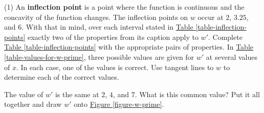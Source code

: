 \documentclass[12pt,]{book}
\newcommand{\terminology}[1]{\textbf{#1}}
\theoremstyle{plain}
\theoremstyle{definition}
\numberwithin{equation}{section}
\newcommand{\hrulemedium}{\noalign{\hrule height 0.07em}}
\newcommand{\hrulethick} {\noalign{\hrule height 0.11em}}
\newcounter{figstack}
\newcounter{figindex}
\newlength\fight
\newcommand\pushValignCaptionBottom[5][b]{%
\stepcounter{figstack}%
\expandafter\def\csname %
figalign\romannumeral\value{figstack}\endcsname{#1}%
\expandafter\def\csname %
figtype\romannumeral\value{figstack}\endcsname{#2}%
\expandafter\def\csname %
figwd\romannumeral\value{figstack}\endcsname{#3}%
\expandafter\def\csname %
figcontent\romannumeral\value{figstack}\endcsname{#4}%
\expandafter\def\csname %
figcap\romannumeral\value{figstack}\endcsname{#5}%
\setbox0=\hbox{%
\begin{#2}{#3}#4\end{#2}}%
\ifdim\dimexpr\ht0+\dp0\relax>\fight\global\setlength{\fight}{%
\dimexpr\ht0+\dp0\relax}\fi%
}
\newcommand\popValignCaptionBottom{%
\setcounter{figindex}{0}%
\hfill%
\whiledo{\value{figindex}<\value{figstack}}{%
\stepcounter{figindex}%
\def\tmp{\csname figwd\romannumeral\value{figindex}\endcsname}%
\begin{\csname figtype\romannumeral\value{figindex}\endcsname}[t]{\tmp}%
\centering%
\stackinset{c}{}%
{\csname figalign\romannumeral\value{figindex}\endcsname}{}%
{\csname figcontent\romannumeral\value{figindex}\endcsname}%
{\rule{0pt}{\fight}}\par%
\csname figcap\romannumeral\value{figindex}\endcsname%
\end{\csname figtype\romannumeral\value{figindex}\endcsname}%
\hfill%
}%
\setcounter{figstack}{0}%
\setlength{\fight}{0pt}%
\hfill%
}
\newcommand{\fe}[2]{#1\mathopen{}\left(#2\right)\mathclose{}}
\newcommand{\fd}[1]{#1'}
\begin{document}
\begin{exercisegroup}(1)
\exercise[17.]\hypertarget{exercise-245}{\null} An \terminology{inflection point} is a point where the function is continuous and the concavity of the function changes. The inflection points on \(w\) occur at \(2\), \(3.25\), and \(6\). With that in mind, over each interval stated in \hyperref[table-inflection-points]{Table \ref{table-inflection-points}} exactly two of the properties from its caption apply to \(\fd{w}\). Complete \hyperref[table-inflection-points]{Table \ref{table-inflection-points}} with the appropriate pairs of properties.%
\exercise[18.]\hypertarget{exercise-246}{\null}In \hyperref[table-values-for-w-prime]{Table \ref{table-values-for-w-prime}}, three possible values are given for \(\fd{w}\) at several values of \(x\). In each case, one of the values is correct. Use tangent lines to \(w\) to determine each of the correct values.%
\exercise[19.]\hypertarget{exercise-247}{\null}The value of \(\fd{w}\) is the same at \(2\), \(4\), and \(7\). What is this common value?%
\exercise[20.]\hypertarget{exercise-248}{\null}Put it all together and draw \(\fd{w}\) onto \hyperref[figure-w-prime]{Figure \ref{figure-w-prime}}.%
\end{exercisegroup}
\par\smallskip\noindent
\typeout{************************************************}
\typeout{************************************************}
\end{document}
